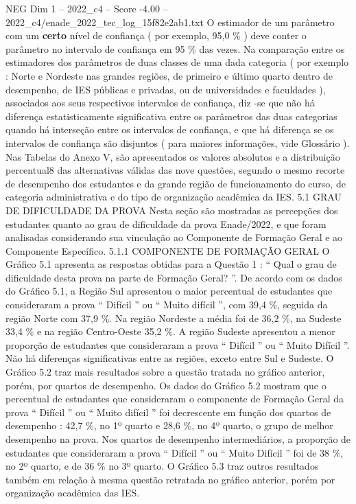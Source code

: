 \begin{textsample}{NEG Dim 1 – 2022\_c4 – Score -4.00 – 2022\_c4/enade\_2022\_tec\_log\_15f82e2ab1.txt}
O estimador de um parâmetro com um \textbf{certo} nível de confiança ( por exemplo, 95,0 \% ) deve conter o parâmetro no intervalo de confiança em 95 \% das vezes.
Na comparação entre os estimadores dos parâmetros de duas classes de uma dada categoria ( por exemplo : Norte e Nordeste nas grandes regiões, de primeiro e último quarto dentro de desempenho, de IES públicas e privadas, ou de universidades e faculdades ), associados aos seus respectivos intervalos de confiança, diz -se que não há diferença estatisticamente significativa entre os parâmetros das duas categorias quando há interseção entre os intervalos de confiança, e que há diferença se os intervalos de confiança são disjuntos ( para maiores informações, vide Glossário ).
Nas Tabelas do Anexo V, são apresentados os valores absolutos e a distribuição percentual8 das alternativas válidas das nove questões, segundo o mesmo recorte de desempenho dos estudantes e da grande região de funcionamento do curso, de categoria administrativa e do tipo de organização acadêmica da IES. 5.1 GRAU DE DIFICULDADE DA PROVA Nesta seção são mostradas as percepções dos estudantes quanto ao grau de dificuldade da prova Enade/2022, e que foram analisadas considerando sua vinculação ao Componente de Formação Geral e ao Componente Específico. 5.1.1 COMPONENTE DE FORMAÇÃO GERAL O Gráfico 5.1 apresenta as respostas obtidas para a Questão 1 : “ Qual o grau de dificuldade desta prova na parte de Formação Geral? ”.
De acordo com os dados do Gráfico 5.1, a Região Sul apresentou o maior percentual de estudantes que consideraram a prova “ Difícil ” ou “ Muito difícil ”, com 39,4 \%, seguida da região Norte com 37,9 \%.
Na região Nordeste a média foi de 36,2 \%, na Sudeste 33,4 \% e na região Centro-Oeste 35,2 \%.
A região Sudeste apresentou a menor proporção de estudantes que consideraram a prova “ Difícil ” ou “ Muito Difícil ”.
Não há diferenças significativas entre as regiões, exceto entre Sul e Sudeste.
O Gráfico 5.2 traz mais resultados sobre a questão tratada no gráfico anterior, porém, por quartos de desempenho.
Os dados do Gráfico 5.2 mostram que o percentual de estudantes que consideraram o componente de Formação Geral da prova “ Difícil ” ou “ Muito difícil ” foi decrescente em função dos quartos de desempenho : 42,7 \%, no 1º quarto e 28,6 \%, no 4º quarto, o grupo de melhor desempenho na prova.
Nos quartos de desempenho intermediários, a proporção de estudantes que consideraram a prova “ Difícil ” ou “ Muito Difícil ” foi de 38 \%, no 2º quarto, e de 36 \% no 3º quarto.
O Gráfico 5.3 traz outros resultados também em relação à mesma questão retratada no gráfico anterior, porém por organização acadêmica das IES.

\end{textsample}
